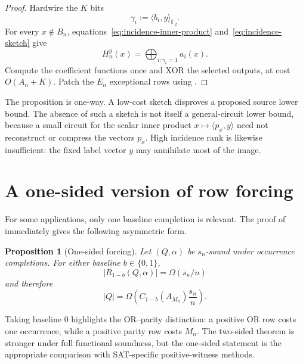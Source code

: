 \documentclass[11pt]{article}
\newtheorem{proposition}[theorem]{Proposition}
\theoremstyle{definition}
\newcommand{\bits}{\{0,1\}}
\newcommand{\F}{\mathbb{F}_2}
\begin{document}
\begin{proof}
Hardwire the $K$ bits
\[
  \gamma_i:=\langle b_i,y\rangle_{\F}.
\]
For every $x\notin B_n$, equations~\eqref{eq:incidence-inner-product} and~\eqref{eq:incidence-sketch} give
\[
  H_n^y(x)
  =\bigoplus_{i:\gamma_i=1}a_i(x).
\]
Compute the coefficient functions once and XOR the selected outputs, at cost $O(A_n+K)$. Patch the $E_n$ exceptional rows using .
\end{proof}

The proposition is one-way. A low-cost sketch disproves a proposed source lower bound. The absence of such a sketch is not itself a general-circuit lower bound, because a small circuit for the scalar inner product $x\mapsto\langle p_x,y\rangle$ need not reconstruct or compress the vectors $p_x$. High incidence rank is likewise insufficient: the fixed label vector $y$ may annihilate most of the image.

\section{A one-sided version of row forcing}\label{app:one-sided}

For some applications, only one baseline completion is relevant. The proof of  immediately gives the following asymmetric form.

\begin{proposition}[One-sided forcing]\label{prop:one-sided}
Let $(Q,\alpha)$ be $s_n$-sound under occurrence completions. For either baseline $b\in\bits$,
\[
  |R_{1-b}(Q,\alpha)|=\Omega(s_n/n)
\]
and therefore
\[
  |Q|=\Omega\!\left(C_{1-b}(A_{M_n})\frac{s_n}{n}\right).
\]
\end{proposition}

Taking baseline $0$ highlights the OR--parity distinction: a positive OR row costs one occurrence, while a positive parity row costs $M_n$. The two-sided theorem is stronger under full functional soundness, but the one-sided statement is the appropriate comparison with SAT-specific positive-witness methods.
\end{document}
